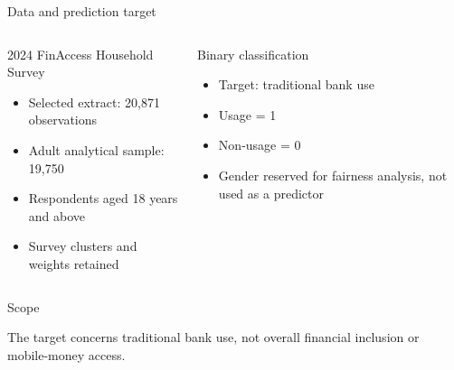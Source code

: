 \documentclass[aspectratio=169,10pt]{beamer}
\begin{document}
\begin{frame}{Data and prediction target}

\begin{columns}[T,onlytextwidth]


\begin{block}{2024 FinAccess Household Survey}

\begin{itemize}

    \item Selected extract: 20,871 observations

    \item Adult analytical sample: 19,750

    \item Respondents aged 18 years and above

    \item Survey clusters and weights retained

\end{itemize}

\end{block}


\begin{block}{Binary classification}

\begin{itemize}

    \item Target: traditional bank use

    \item Usage = 1

    \item Non-usage = 0

    \item Gender reserved for fairness analysis, not used as a predictor

\end{itemize}

\end{block}

\end{columns}

\begin{alertblock}{Scope}

The target concerns traditional bank use, not overall financial inclusion or mobile-money access.

\end{alertblock}

\end{frame}
\end{document}
